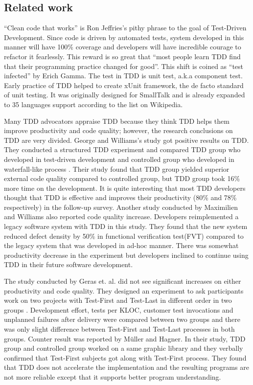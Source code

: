 \subsection{Related work}
``Clean code that works'' is Ron Jeffries's pithy phrase to the goal of
Test-Driven Development\cite{Beck:03}. Since code is driven by automated
tests, system developed in this manner will have 100\% coverage and
developers will have incredible courage to refactor it fearlessly. This
reward is so great that ``most people learn TDD find that their programming
practice changed for good''\cite{Beck:03}. This shift is coined as ``test
infected'' by Erich Gamma. The test in TDD is unit test, a.k.a component
test. Early practice of TDD helped to create xUnit framework, the de facto
standard of unit testing. It was originally designed for SmallTalk and is
already expanded to 35 languages support according to the list on
Wikipedia\cite{xUnit}.

Many TDD advocators appraise TDD because they think TDD helps them improve
productivity and code quality; however, the research conclusions on TDD are
very divided. George and Williams's study got positive results on TDD. They
conducted a structured TDD experiment and compared TDD group who developed
in test-driven development and controlled group who developed in
waterfall-like process \cite{George:03}. Their study found that TDD group
yielded superior external code quality compared to controlled group, but
TDD group took 16\% more time on the development. It is quite interesting
that most TDD developers thought that TDD is effective and improves their
productivity (80\% and 78\% respectively) in the follow-up survey.  Another
study conducted by Maximilien and Williams also reported code quality
increase. Developers reimplemented a legacy software system with TDD in this
study. They found that the new system reduced defect density by 50\% in
functional verification test(FVT) compared to the legacy system that was
developed in ad-hoc manner\cite{Maximilien:03}. There was somewhat
productivity decrease in the experiment but developers inclined to continue
using TDD in their future software development. 

The study conducted by Geras et. al. did not see significant increases on
either productivity and code quality.  They designed an experiment to ask
participants work on two projects with Test-First and Test-Last in
different order in two groups \cite{Geras:04}.  Development effort, tests
per KLOC, customer test invocations and unplanned failures after delivery
were compared between two groups and there was only slight difference
between Test-First and Test-Last processes in both groups. Counter result
was reported by M\"uller and Hagner\cite{Muller:02}.  In their study, TDD
group and controlled group worked on a same graphic library and they
verbally confirmed that Test-First subjects got along with Test-First
process. They found that TDD does not accelerate the implementation and the
resulting programs are not more reliable except that it supports better
program understanding.

